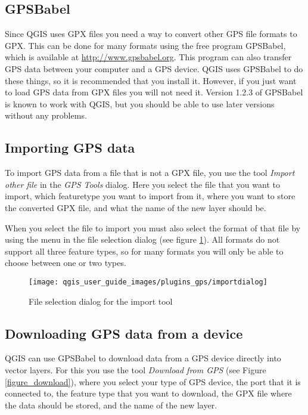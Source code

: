 \subsection{GPSBabel}

Since QGIS uses GPX files you need a way to convert other GPS file
formats to GPX. This can be done for many formats using the free program
GPSBabel, which is available at \url{http://www.gpsbabel.org}. This
program can also transfer GPS data between your computer and a GPS
device. QGIS uses GPSBabel to do these things, so it is recommended
that you install it. However, if you just want to load GPS data from
GPX files you will not need it. Version 1.2.3 of GPSBabel is known
to work with QGIS, but you should be able to use later versions without
any problems.


\subsection{Importing GPS data}

To import GPS data from a file that is not a GPX file, you use the
tool \emph{Import other file} in the \emph{GPS Tools} dialog. Here
you select the file that you want to import, which featuretype you
want to import from it, where you want to store the converted GPX
file, and what the name of the new layer should be.

When you select the file to import you must also select the format
of that file by using the menu in the file selection dialog (see figure
\ref{figure importdialog}). All formats do not support all three
feature types, so for many formats you will only be able to choose
between one or two types.

%
\begin{figure}

\caption{\label{figure importdialog}File selection dialog for the import
tool}

\texttt{[image: qgis\_user\_guide\_images/plugins\_gps/importdialog]}
\end{figure}



\subsection{Downloading GPS data from a device}

QGIS can use GPSBabel to download data from a GPS device directly
into vector layers. For this you use the tool \emph{Download from
GPS} (see Figure \ref{figure_download}), where you select your type
of GPS device, the port that it is connected to, the feature type
that you want to download, the GPX file where the data should be stored,
and the name of the new layer.

